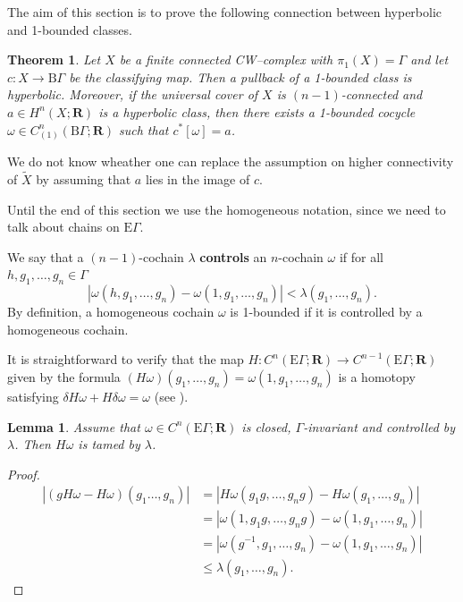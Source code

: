 \documentclass[12pt,reqno,a4paper]{amsart}
\renewcommand{\emph}[1]{{\bfseries\boldmath #1}}
\newtheorem{theorem}[subsection]{Theorem}%
\newtheorem{lemma}[subsection]{Lemma}
\theoremstyle{definition}
\theoremstyle{remark}
\newenvironment{remark}
    {\pushQED{\qed}\renewcommand{\qedsymbol}{$\lozenge$}\remarkx}
    {\popQED\endremarkx}
\numberwithin{equation}{section}
\numberwithin{figure}{section}
\newcommand{\B}[1]{{\mathbf #1}}
\newcommand{\R}{\mathrm}
\begin{document}
The aim of this section is to prove the following connection between
hyperbolic and 1-bounded classes.

\begin{theorem}\label{T:hyperbolic}
Let $X$ be a finite connected CW--complex with $\pi_1(X)=\Gamma$ and let
$c\colon X\to\R B\Gamma$ be the classifying map.  Then a pullback of a
1-bounded class is hyperbolic.  Moreover, if the universal cover of\/ $X$
is $(n-1)$-connected and $a\in H^n(X;\B R)$ is a hyperbolic class,
then there exists a 1-bounded cocycle 
$\omega \in C^n_{(1)}(\R B\Gamma;\B R)$ such that $c^*[\omega]=a$.
\end{theorem}

\begin{remark}
We do not know wheather one can replace the assumption on higher connectivity
of $\widetilde X$ by assuming that $a$ lies in the image of $c$.
\end{remark}

Until the end of this section  we use the homogeneous notation, since
we need to talk about chains on $\R E\Gamma$.

We say that a $(n-1)$-cochain $\lambda$ \emph{controls} an $n$-cochain $\omega$
if for all $h,g_1,\dots,g_n\in\Gamma$
\begin{equation}
|\omega(h,g_1,\dots,g_n)-\omega(1,g_1,\dots,g_n)|<\lambda(g_1,\dots,g_n).
\label{Eq:control}
\end{equation}
By definition, a homogeneous cochain $\omega$ is 1-bounded if it is controlled
by a homogeneous cochain.

It is straightforward to verify that the map 
$H\colon C^n(\R E\Gamma;\B R)\to C^{n-1}(\R E\Gamma;\B R)$
given by the formula $(H\omega)(g_1,\dots,g_n)=\omega(1,g_1,\dots,g_n)$ is a homotopy
satisfying $\delta H\omega+H\delta\omega=\omega$ (see \cite[Page 18]{zbMATH03935317}).

\begin{lemma}\label{L:controlled-tamed}
Assume that $\omega\in C^n(\R E\Gamma;\B R)$ is closed, $\Gamma$-invariant
and controlled by $\lambda$.  Then $H\omega$ is tamed by $\lambda$.
\end{lemma}

\begin{proof}
\begin{align*}
|(gH\omega-H\omega)(g_1\dots,g_n)|
&=|H\omega(g_1g,\dots,g_ng)-H\omega(g_1,\dots,g_n)|\\
&=|\omega(1,g_1g,\dots,g_ng)-\omega(1,g_1,\dots,g_n)|\\
&=|\omega(g^{-1},g_1,\dots,g_n)-\omega(1,g_1,\dots,g_n)|\\
&\leq\lambda(g_1,\dots,g_n).
\end{align*}
\end{proof}
\end{document}
